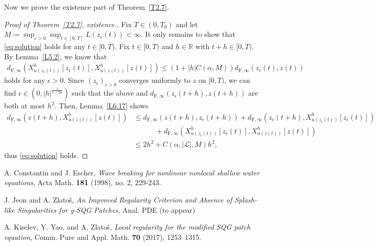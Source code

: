 \documentclass[reqno,centertags,12pt]{amsart}
\theoremstyle{definition}
\numberwithin{equation}{section}
\newcommand{\abs}[1]{\left\lvert#1\right\rvert}
\newcommand{\seq}[1]{\left( #1 \right)}
\newcommand{\bbR}{{\mathbb{R}}}
\begin{document}
Now we prove the existence part of Theorem~\ref{T2.7}.

\begin{proof}[Proof of Theorem~\ref{T2.7}, existence.]
    Fix $T\in(0,T_{0})$ and let
    $M\coloneqq\sup_{\epsilon>0}\sup_{t\in[0,T]}L(z_{\epsilon}(t)) < \infty$.
    It only remains to show that \eqref{eq:solution} holds for any $t\in [0,T)$.
    Fix $t\in [0,T)$ and $h\in\bbR$ with $t+h\in[0,T)$.
    By Lemma~\ref{L5.2}, we know that
    \begin{align*}
        d_{\mathrm{F},\infty}\left(
            X_{u(z_{\epsilon}(t))}^{h}[z_{\epsilon}(t)],
            X_{u(z(t))}^{h}[z(t)]
        \right)
        \leq (1+\abs{h}C(\alpha,M))d_{\mathrm{F},\infty}(z_{\epsilon}(t), z(t))
    \end{align*}
    holds for any $\epsilon>0$. Since $\seq{z_{\epsilon}}_{\epsilon>0}$
    converges uniformly to $z$ on $[0,T)$, we can find
    $\epsilon\in\left(0,\abs{h}^{\frac{1}{1-2\alpha}}\right)$ such that
    the above and $d_{\mathrm{F},\infty}(z_{\epsilon}(t+h),z(t+h))$
    are both at most $h^{2}$. Then, Lemma~\ref{L6.17} shows
    \begin{align*}
        d_{\mathrm{F},\infty}(z(t+h), X_{u(z(t))}^{h}[z(t)])
        &\leq d_{\mathrm{F},\infty}(z(t+h), z_{\epsilon}(t+h))
        + d_{\mathrm{F},\infty}(z_{\epsilon}(t+h),
        X_{u(z_{\epsilon}(t))}^{h}[z_{\epsilon}(t)])
        \\&\quad\quad\quad
        + d_{\mathrm{F},\infty}\left(
            X_{u(z_{\epsilon}(t))}^{h}[z_{\epsilon}(t)],
            X_{u(z(t))}^{h}[z(t)]
        \right) \\
        &\leq 2h^{2} + C(\alpha,\abs{\mathcal{L}},M)h^{2},
    \end{align*}
    thus \eqref{eq:solution} holds.
\end{proof}



\begin{thebibliography}{10}

    A. Constantin and J. Escher,
    \textit{Wave breaking for nonlinear nonlocal shallow water equations},
    Acta Math. \textbf{181} (1998), no. 2, 229-243.

    J. Jeon and A. Zlato\v{s},
    \textit{An Improved Regularity Criterion and Absence of Splash-like Singularities for g-SQG Patches},
    \rm Anal. PDE (to appear)

    A. Kiselev, Y. Yao, and A. Zlato\v{s},
    \textit{Local regularity for the modified SQG patch equation},
    Comm. Pure and Appl. Math. \textbf{70} (2017), 1253--1315.
\end{thebibliography}
\end{document}
